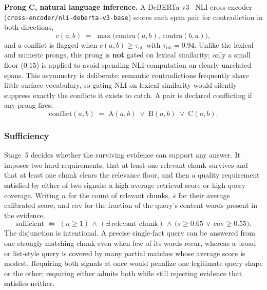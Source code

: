 \documentclass[conference]{IEEEtran}
\begin{document}
\textbf{Prong C, natural language inference.} A DeBERTa-v3~\cite{he2021deberta}
NLI cross-encoder (\texttt{cross-encoder/nli-deberta-v3-base}) scores each
span pair for contradiction in both directions,
\begin{equation}
c(a,b) \;=\; \max\bigl(\mathrm{contra}(a,b),\,\mathrm{contra}(b,a)\bigr),
\label{eq:nli}
\end{equation}
and a conflict is flagged when $c(a,b) \geq \tau_{\text{nli}}$ with
$\tau_{\text{nli}} = 0.94$. Unlike the lexical and numeric prongs, this
prong is \textbf{not} gated on lexical similarity; only a small floor
($0.15$) is applied to avoid spending NLI computation on clearly unrelated
spans. This asymmetry is deliberate: semantic contradictions frequently
share little surface vocabulary, so gating NLI on lexical similarity would
silently suppress exactly the conflicts it exists to catch. A pair is
declared conflicting if any prong fires:
\begin{equation}
\mathrm{conflict}(a,b) \;=\;
\mathrm{A}(a,b)\;\vee\;\mathrm{B}(a,b)\;\vee\;\mathrm{C}(a,b).
\label{eq:conflict}
\end{equation}

\subsubsection{Sufficiency}
\label{sec:sufficiency}
Stage~5 decides whether the surviving evidence can support any answer. It
imposes two hard requirements, that at least one relevant chunk survives
and that at least one chunk clears the relevance floor, and then a quality
requirement satisfied by either of two signals: a high average retrieval
score or high query coverage. Writing $n$ for the count of relevant
chunks, $\bar{s}$ for their average calibrated score, and
$\mathrm{cov}$ for the fraction of the query's content words present in the
evidence,
\begin{equation}
\mathrm{sufficient} \;\Longleftrightarrow\;
(n \geq 1)\,\wedge\,(\exists\,\text{relevant chunk})\,\wedge\,
\bigl(\bar{s} \geq 0.65 \,\vee\, \mathrm{cov} \geq 0.55\bigr).
\label{eq:suff}
\end{equation}
The disjunction is intentional. A precise single-fact query can be answered
from one strongly matching chunk even when few of its words recur, whereas
a broad or list-style query is covered by many partial matches whose
average score is modest. Requiring both signals at once would penalize one
legitimate query shape or the other; requiring either admits both while
still rejecting evidence that satisfies neither.
\end{document}
